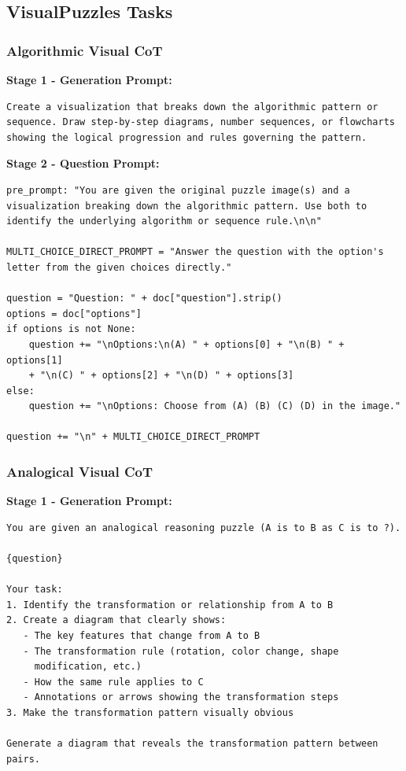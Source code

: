 \documentclass{article}
\theoremstyle{plain}
\theoremstyle{definition}
\theoremstyle{remark}
\begin{document}
\subsection{VisualPuzzles Tasks}

\subsubsection{Algorithmic Visual CoT}

\textbf{Stage 1 - Generation Prompt:}

\begin{verbatim}
Create a visualization that breaks down the algorithmic pattern or
sequence. Draw step-by-step diagrams, number sequences, or flowcharts
showing the logical progression and rules governing the pattern.
\end{verbatim}

\textbf{Stage 2 - Question Prompt:}

\begin{verbatim}
pre_prompt: "You are given the original puzzle image(s) and a
visualization breaking down the algorithmic pattern. Use both to
identify the underlying algorithm or sequence rule.\n\n"

MULTI_CHOICE_DIRECT_PROMPT = "Answer the question with the option's
letter from the given choices directly."

question = "Question: " + doc["question"].strip()
options = doc["options"]
if options is not None:
    question += "\nOptions:\n(A) " + options[0] + "\n(B) " + options[1]
    + "\n(C) " + options[2] + "\n(D) " + options[3]
else:
    question += "\nOptions: Choose from (A) (B) (C) (D) in the image."

question += "\n" + MULTI_CHOICE_DIRECT_PROMPT
\end{verbatim}

\subsubsection{Analogical Visual CoT}

\textbf{Stage 1 - Generation Prompt:}

\begin{verbatim}
You are given an analogical reasoning puzzle (A is to B as C is to ?).

{question}

Your task:
1. Identify the transformation or relationship from A to B
2. Create a diagram that clearly shows:
   - The key features that change from A to B
   - The transformation rule (rotation, color change, shape
     modification, etc.)
   - How the same rule applies to C
   - Annotations or arrows showing the transformation steps
3. Make the transformation pattern visually obvious

Generate a diagram that reveals the transformation pattern between
pairs.
\end{verbatim}
\end{document}
